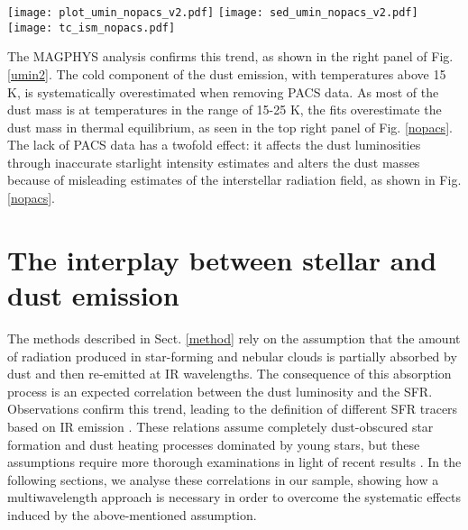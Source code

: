 \documentclass{aa}
\begin{document}
\begin{figure*}\begin{center}
\texttt{[image: plot\_umin\_nopacs\_v2.pdf]}
\texttt{[image: sed\_umin\_nopacs\_v2.pdf]}
\texttt{[image: tc\_ism\_nopacs.pdf]}
\end{center} 
\caption{Left panel: $U_{min}$ parameter of \cite{dra} obtained with CIGALE \citep{nol} using the full photometric coverage (ordinate) or removing PACS data (abscissa). The dashed line shows a linear relation between the two quantities and the black cross in the bottom right corner shows the average errors in the fit. Middle panel: Median SED with 16th and 84th percentiles (dotted line) obtained using the full photometric coverage (black solid) or removing PACS data (red dashed line). Right panel: Cold dust in thermal equilibrium within the ISM ($T^C_{ISM}$) parameter obtained with MAGPHYS \citep{dac} using the full photometric coverage (ordinate) or removing PACS data (abscissa). The dashed line shows a linear relation between the two quantities and the black cross in the bottom right corner shows the average errors in the fit.}\label{umin2}\end{figure*}

The MAGPHYS analysis confirms this trend, as shown in the right panel of Fig. \ref{umin2}. The cold component of the dust emission, with temperatures above 15 K, is systematically overestimated when removing PACS data. As most of the dust mass is at temperatures in the range of 15-25 K, the fits overestimate the dust mass in thermal equilibrium, as seen in the top right panel of Fig. \ref{nopacs}. The lack of PACS data has a twofold effect: it affects the dust luminosities through inaccurate starlight intensity estimates and alters the dust masses because of misleading estimates of the interstellar radiation field, as shown in Fig. \ref{nopacs}.

\section{The interplay between stellar and dust emission}
\label{discussion}

The methods described in Sect. \ref{method} rely on the assumption that the amount of radiation produced in star-forming and nebular clouds is partially absorbed by dust and then re-emitted at IR wavelengths.  The consequence of this absorption process is an expected correlation between the dust luminosity and the SFR. Observations confirm this trend, leading to the definition of different SFR tracers based on IR emission \citep[see][for a complete review]{ken1,ken2}. These relations assume completely dust-obscured  star formation and dust heating processes dominated by young stars, but these assumptions require more thorough examinations in light of recent results \citep[e.g.][]{gal1,gal2}. In the following sections, we analyse these correlations in our sample, showing how a multiwavelength approach is necessary in order to overcome the systematic effects induced by the above-mentioned assumption.
\end{document}
